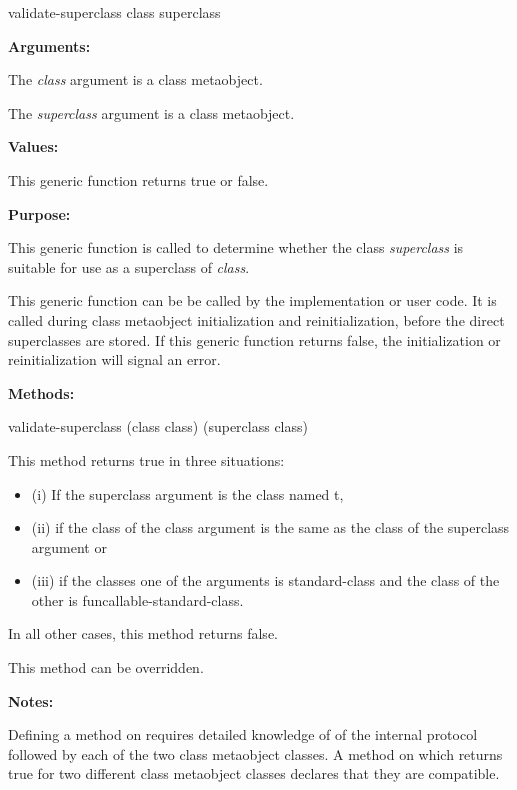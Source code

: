 \begin{defun}
validate-superclass class superclass

\textbf{Arguments:}

The \emph{class} argument is a class metaobject.

The \emph{superclass} argument is a class metaobject.

\textbf{Values:}

This generic function returns true or false.

\textbf{Purpose:}

This generic function is called to determine whether the class \emph{superclass}
is suitable for use as a superclass of \emph{class}.

This generic function can be be called by the implementation or user code. It is
called during class metaobject initialization and reinitialization, before the
direct superclasses are stored. If this generic function returns false, the
initialization or reinitialization will signal an error.

\textbf{Methods:}

\begin{defun}
validate-superclass (class class) (superclass class)

This method returns true in three situations:

\begin{itemize}
\item (i) If the superclass argument is the class named t,
\item (ii) if the class of the class argument is the same as the class of the
  superclass argument or
\item (iii) if the classes one of the arguments is standard-class and the class
  of the other is funcallable-standard-class.
\end{itemize}

In all other cases, this method returns false.

This method can be overridden.
\end{defun}

\textbf{Notes:}

Defining a method on  requires detailed knowledge of of the
internal protocol followed by each of the two class metaobject classes. A method
on  which returns true for two different class metaobject
classes declares that they are compatible.
\end{defun}

